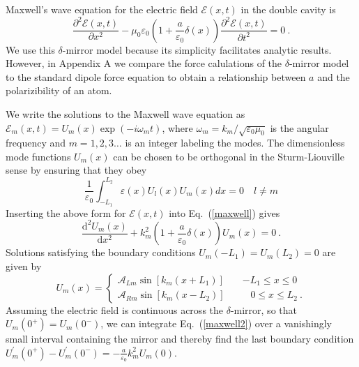 \documentclass[twocolumn,english,pra,aps,superscriptaddress,floatfix]{revtex4-1}
\begin{document}
Maxwell's wave equation for the electric field $\mathcal{E}(x,t)$ in the double cavity is
\begin{equation}
\frac{\partial^{2}\mathcal{E}(x,t)}{\partial x^{2}}-\mu_{0}\varepsilon_{0}(1+\frac{a}{\varepsilon_{0}}\delta(x))\frac{\partial^{2}\mathcal{E}(x,t)}{\partial t^{2}}=0 \ .
\label{maxwell}
\end{equation}
We use this $\delta$-mirror model because its simplicity facilitates analytic results. However, in Appendix A we compare the force calulations of the $\delta$-mirror model to the standard dipole force equation to obtain a relationship between $a$ and the polarizibility of an atom.   


We write the solutions to the Maxwell wave equation as $\mathcal{E}_{m}(x,t)=U_{m}(x) \exp(-i\omega_{m}t)$,  where $\omega_{m}=k_{m}/\sqrt{\varepsilon_{0}\mu_{0}}$ is the angular frequency and $m=1,2,3 \ldots$ is an integer labeling the modes. The dimensionless mode functions $U_{m}(x)$ can be chosen to be orthogonal
in the Sturm-Liouville sense by ensuring that they obey
\begin{equation}
\frac{1}{\varepsilon_{0}}\int_{-L_{1}}^{L_{2}}\varepsilon(x)U_{l}(x)U_{m}(x)dx=0 \quad  l \neq m
\label{normalization}
\end{equation}
Inserting the above form for $\mathcal{E}(x,t)$ into Eq.\ (\ref{maxwell}) gives
\begin{equation}
\frac{\mathrm{d}^{2}U_{m}(x)}{\mathrm{d}x^{2}}+k_{m}^{2}(1+\frac{a}{\varepsilon_{0}}\delta(x))U_{m}(x)=0 \ .
\label{maxwell2}
\end{equation}
Solutions satisfying the boundary conditions $U_{m}(-L_{1})=U_{m}(L_{2})=0$
are given by
\begin{equation}
U_{m}(x)=\begin{cases}
\mathcal{A}_{Lm}\sin \left[k_{m}(x+L_{1})\right]\quad & -L_{1} \leq x\leq0\\
\mathcal{A}_{Rm}\sin \left[k_{m}(x-L_{2})\right]\quad & \,\:\:\:0 \leq x \leq L_{2} \ . \end{cases}
\label{Wavemode}
\end{equation}
Assuming the electric field is continuous across
the $\delta$-mirror, so that $U_{m}(0^{+})=U_{m}(0^{-})$, we can integrate Eq.\ (\ref{maxwell2}) over a vanishingly small interval containing the mirror and thereby find the last boundary condition
$U_{m}^{\prime}(0^{+})-U_{m}^{\prime}(0^{-})=-\frac{a}{\varepsilon_{0}} k_{m}^{2}U_{m}(0)$.
\end{document}
